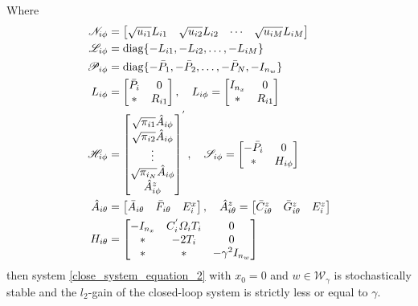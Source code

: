 \documentclass[conference]{IEEEtran}
\begin{document}
Where 
\begin{equation}\notag
\begin{aligned}
	\mathscr{N}_{i\phi}&=\begin{bmatrix}
		\sqrt{u_{i1}}L_{i1}&\sqrt{u_{i2}}L_{i2}&\cdots&\sqrt{u_{iM}}L_{iM}
	\end{bmatrix}\\
\mathscr{L}_{i\phi}&=\mathrm{diag} \{-L_{i1},-L_{i2},\dots,-L_{iM}  \}\\
\mathscr{P}_{i\phi}&=\mathrm{diag}\{-\bar{P}_{1},-\bar{P}_{2},\dots,-\bar{P}_{N},-I_{n_w}  \}\\
	L_{i\phi}&=\begin{bmatrix}
	\bar{P}_{i}&0\\
	*&R_{i1}
	\end{bmatrix}, \quad
	L_{i\phi}=\begin{bmatrix}
	I_{n_x}&0\\
	*&R_{i1}
	\end{bmatrix}\\
	\mathscr{H}_{i\phi}&=\begin{bmatrix}
		\sqrt{\pi_{i1}}\hat{A}_{i\phi}\\
		\sqrt{\pi_{i2}}\hat{A}_{i\phi}\\
		\vdots\\
		\sqrt{\pi_{i_N}}\hat{A}_{i\phi}\\
		\hat{A}^{z}_{i\phi}
		\end{bmatrix}^{'}, \quad
	\mathscr{S}_{i\phi}=\begin{bmatrix}
		-\bar{P}_{i}&0\\
		*&H_{i\phi}
	\end{bmatrix}\\
\hat{A}_{i\theta}&=\begin{bmatrix}
\bar{A}_{i\theta}&\bar{F}_{i\theta}&E^{x}_{i}
\end{bmatrix},\quad
\hat{A}^{z}_{i\theta}=\begin{bmatrix}
\bar{C}^{z}_{i\theta}&\bar{G}^{z}_{i\theta}&E^{z}_{i}
\end{bmatrix}  \\
H_{i\theta}&=\begin{bmatrix}
-I_{n_x}&C^{'}_{i}\varOmega_{i}T_{i}&0\\
*&-2T_{i}&0\\
*&*&-\gamma^{2}I_{n_w}
\end{bmatrix}
\end{aligned}
\end{equation}
then system \eqref{close_system_equation_2}  with $x_0=0$ and $w\in\mathcal{W}_{\gamma}$ is stochastically stable and the $l_2$-gain of the closed-loop system is strictly less or equal to $\gamma$.
\end{document}
